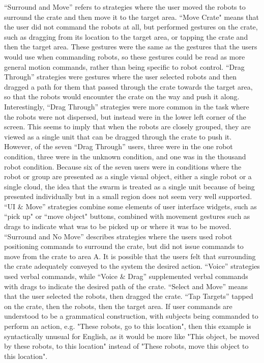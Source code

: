 ``Surround and Move'' refers to strategies where the user moved the robots to surround the crate and then move it to the target area. 
``Move Crate" means that the user did not command the robots at all, but performed gestures on the crate, such as dragging from its location to the target area, or tapping the crate and then the target area. 
These gestures were the same as the gestures that the users would use when commanding robots, so these gestures could be read as more general motion commands, rather than being specific to robot control. 
``Drag Through'' strategies were gestures where the user selected robots and then dragged a path for them that passed through the crate towards the target area, so that the robots would encounter the crate on the way and push it along. 
Interestingly, ``Drag Through'' strategies were more common in the task where the robots were not dispersed, but instead were in the lower left corner of the screen. 
This seems to imply that when the robots are closely grouped, they are viewed as a single unit that can be dragged through the crate to push it. 
However, of the seven ``Drag Through'' users, three were in the one robot condition, three were in the unknown condition, and one was in the thousand robot condition. 
Because six of the seven users were in conditions where the robot or group are presented as a single visual object, either a single robot or a single cloud, the idea that the swarm is treated as a single unit because of being presented individually but in a small region does not seem very well supported. 
``UI \& Move'' strategies combine some elements of user interface widgets, such as ``pick up" or ``move object" buttons, combined with movement gestures such as drags to indicate what was to be picked up or where it was to be moved. 
``Surround and No Move'' describes strategies where the users used robot positioning commands to surround the crate, but did not issue commands to move from the crate to area A.
It is possible that the users felt that surrounding the crate adequately conveyed to the system the desired action. 
``Voice'' strategies used verbal commands, while ``Voice \& Drag'' supplemented verbal commands with drags to indicate the desired path of the crate. 
``Select and Move'' means that the user selected the robots, then dragged the crate.
``Tap Targets'' tapped on the crate, then the robots, then the target area. 
If user commands are understood to be a grammatical construction, with subjects being commanded to perform an action, e.g. "These robots, go to this location", then this example is syntactically unusual for English, as it would be more like "This object, be moved by these robots, to this location" instead of "These robots, move this object to this location". 
